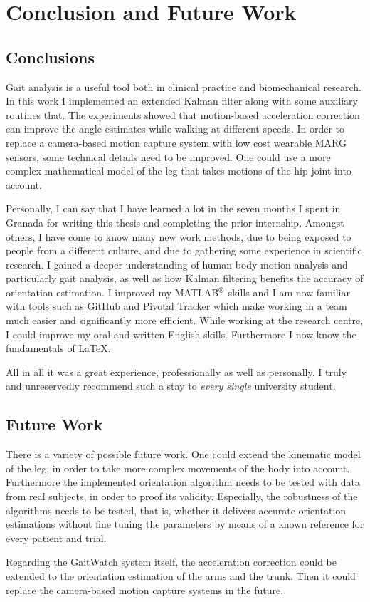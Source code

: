 \chapter{Conclusion and Future Work}
\label{ch:Conclusion and Future Work}

\section{Conclusions}

Gait analysis is a useful tool both in clinical practice and biomechanical research. In this work I implemented an extended Kalman filter along with some auxiliary routines that. The experiments showed that motion-based acceleration correction can improve the angle estimates while walking at different speeds. In order to replace a camera-based motion capture system with low cost wearable MARG sensors, some technical details need to be improved. One could use a more complex mathematical model of the leg that takes motions of the hip joint into account.

Personally, I can say that I have learned a lot in the seven months I spent in Granada for writing this thesis and completing the prior internship. Amongst others, I have come to know many new work methods, due to being exposed to people from a different culture, and due to gathering some experience in scientific research. I gained a deeper understanding of human body motion analysis and particularly gait analysis, as well as how Kalman filtering benefits the accuracy of orientation estimation. I improved my MATLAB$\textsuperscript{\textregistered}$ skills and I am now familiar with tools such as GitHub and Pivotal Tracker which make working in a team much easier and significantly more efficient.  While working at the research centre, I could improve my oral and written English skills. Furthermore I now know the fundamentals of \LaTeX{}.

All in all it was a great experience, professionally as well as personally. I truly and unreservedly recommend such a stay to \emph{every single} university student.

\section{Future Work}

There is a variety of possible future work. One could extend the kinematic model of the leg, in order to take more complex movements of the body into account. Furthermore the implemented orientation algorithm needs to be tested with data from real subjects, in order to proof its validity. Especially, the robustness of the algorithms needs to be tested, that is, whether it delivers accurate orientation estimations without fine tuning the parameters by means of a known reference for every patient and trial.

Regarding the GaitWatch system itself, the acceleration correction could be extended to the orientation estimation of the arms and the trunk. Then it could replace the camera-based motion capture systems in the future.


